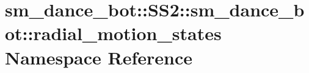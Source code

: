 \hypertarget{namespacesm__dance__bot_1_1SS2_1_1sm__dance__bot_1_1radial__motion__states}{}\section{sm\+\_\+dance\+\_\+bot\+:\+:S\+S2\+:\+:sm\+\_\+dance\+\_\+bot\+:\+:radial\+\_\+motion\+\_\+states Namespace Reference}
\label{namespacesm__dance__bot_1_1SS2_1_1sm__dance__bot_1_1radial__motion__states}
